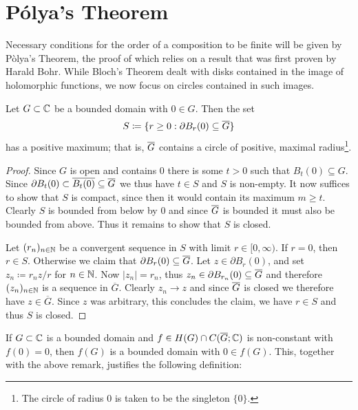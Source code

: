 \section{Pólya's Theorem}
\label{sec:polyas-theorem}

Necessary conditions for the order of a composition to be finite will be given by Pòlya's Theorem, the proof of which relies on a result that was first proven by Harald Bohr. While Bloch's Theorem dealt with disks contained in the image of holomorphic functions, we now focus on circles contained in such images.

\begin{proposition}
    Let $G \subset \mathbb{C}$ be a bounded domain with $0 \in G$. Then the set
    \begin{equation} \label{eq:set-circle-maximal-radius}
        S \coloneqq \{ r \geq 0 : \partial B_r(0) \subseteq \overline{G} \}
    \end{equation}
    has a positive maximum; that is, $\overline{G}$ contains a circle of positive, maximal radius\footnote{The circle of radius $0$ is taken to be the singleton $\{ 0 \}$.}.
\end{proposition}

\begin{proof}
    Since $G$ is open and contains $0$ there is some $t > 0$ such that $B_t(0) \subseteq G$. Since $\partial B_t(0) \subset \overline{B_t(0)} \subseteq \overline{G}$ we thus have $t \in S$ and $S$ is non-empty. It now suffices to show that $S$ is compact, since then it would contain its maximum $m \geq t$. Clearly $S$ is bounded from below by $0$ and since $\overline{G}$ is bounded it must also be bounded from above. Thus it remains to show that $S$ is closed.

    Let $(r_n)_{n \in \mathbb{N}}$ be a convergent sequence in $S$ with limit $r \in [0, \infty)$. If $r = 0$, then $r \in S$. Otherwise we claim that $\partial B_r(0) \subseteq \overline{G}$. Let $z \in \partial B_r(0)$, and set $z_n \coloneqq r_n z / r$ for $n \in \mathbb{N}$. Now $\vert z_n \vert = r_n$, thus $z_n \in \partial B_{r_n}(0) \subseteq \overline{G}$ and therefore $(z_n)_{n \in \mathbb{N}}$ is a sequence in $\overline{G}$. Clearly $z_n \to z$ and since $\overline{G}$ is closed we therefore have $z \in \overline{G}$. Since $z$ was arbitrary, this concludes the claim, we have $r \in S$ and thus $S$ is closed.
\end{proof}

If $G \subset \mathbb{C}$ is a bounded domain and $f \in H(G) \cap C(\overline{G}; \mathbb{C})$ is non-constant with $f(0) = 0$, then $f(G)$ is a bounded domain with $0 \in f(G)$. This, together with the above remark, justifies the following definition:

